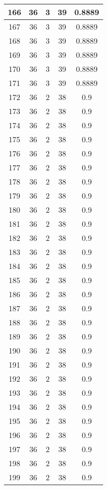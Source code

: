\documentclass[letterpaper, 12pt]{article}
\begin{document}
\begin{longtable}{|c|c|c|c|c|}
\hline
166 & 36 & 3 & 39 & 0.8889 \\
\hline
167 & 36 & 3 & 39 & 0.8889 \\
\hline
168 & 36 & 3 & 39 & 0.8889 \\
\hline
169 & 36 & 3 & 39 & 0.8889 \\
\hline
170 & 36 & 3 & 39 & 0.8889 \\
\hline
171 & 36 & 3 & 39 & 0.8889 \\
\hline
172 & 36 & 2 & 38 & 0.9 \\
\hline
173 & 36 & 2 & 38 & 0.9 \\
\hline
174 & 36 & 2 & 38 & 0.9 \\
\hline
175 & 36 & 2 & 38 & 0.9 \\
\hline
176 & 36 & 2 & 38 & 0.9 \\
\hline
177 & 36 & 2 & 38 & 0.9 \\
\hline
178 & 36 & 2 & 38 & 0.9 \\
\hline
179 & 36 & 2 & 38 & 0.9 \\
\hline
180 & 36 & 2 & 38 & 0.9 \\
\hline
181 & 36 & 2 & 38 & 0.9 \\
\hline
182 & 36 & 2 & 38 & 0.9 \\
\hline
183 & 36 & 2 & 38 & 0.9 \\
\hline
184 & 36 & 2 & 38 & 0.9 \\
\hline
185 & 36 & 2 & 38 & 0.9 \\
\hline
186 & 36 & 2 & 38 & 0.9 \\
\hline
187 & 36 & 2 & 38 & 0.9 \\
\hline
188 & 36 & 2 & 38 & 0.9 \\
\hline
189 & 36 & 2 & 38 & 0.9 \\
\hline
190 & 36 & 2 & 38 & 0.9 \\
\hline
191 & 36 & 2 & 38 & 0.9 \\
\hline
192 & 36 & 2 & 38 & 0.9 \\
\hline
193 & 36 & 2 & 38 & 0.9 \\
\hline
194 & 36 & 2 & 38 & 0.9 \\
\hline
195 & 36 & 2 & 38 & 0.9 \\
\hline
196 & 36 & 2 & 38 & 0.9 \\
\hline
197 & 36 & 2 & 38 & 0.9 \\
\hline
198 & 36 & 2 & 38 & 0.9 \\
\hline
199 & 36 & 2 & 38 & 0.9 \\
\hline
\end{longtable}
\end{document}
